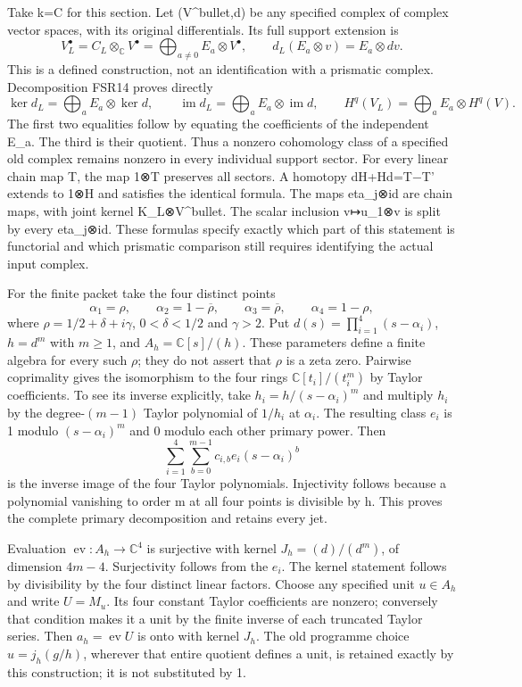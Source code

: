 \documentclass[
  10pt,
  a4paper,
]{article}
\begin{document}
Take k=C for this section. Let (V\^{}bullet,d) be any specified complex
of complex vector spaces, with its original differentials. Its full
support extension is \[
V_L^\bullet=C_L\otimes_{\mathbb C}V^\bullet
=\bigoplus_{a\neq0}E_a\otimes V^\bullet,
\qquad d_L(E_a\otimes v)=E_a\otimes dv.
\tag{FSR23}
\] This is a defined construction, not an identification with a
prismatic complex. Decomposition FSR14 proves directly \[
\ker d_L=\bigoplus_a E_a\otimes\ker d,
\qquad\operatorname{im}d_L=\bigoplus_a E_a\otimes\operatorname{im}d,
\qquad H^q(V_L)=\bigoplus_a E_a\otimes H^q(V).
\tag{FSR24}
\] The first two equalities follow by equating the coefficients of the
independent E\_a. The third is their quotient. Thus a nonzero cohomology
class of a specified old complex remains nonzero in every individual
support sector. For every linear chain map T, the map 1⊗T preserves all
sectors. A homotopy dH+Hd=T−T' extends to 1⊗H and satisfies the
identical formula. The maps eta\_j⊗id are chain maps, with joint kernel
K\_L⊗V\^{}bullet. The scalar inclusion v↦u\_1⊗v is split by every
eta\_j⊗id. These formulas specify exactly which part of this statement
is functorial and which prismatic comparison still requires identifying
the actual input complex.

For the finite packet take the four distinct points \[
\alpha_1=\rho,\qquad\alpha_2=1-\overline\rho,\qquad
\alpha_3=\overline\rho,\qquad\alpha_4=1-\rho,
\] where \(\rho=1/2+\delta+i\gamma\), \(0<\delta<1/2\) and \(\gamma>2\).
Put \(d(s)=\prod_{i=1}^4(s-\alpha_i)\), \(h=d^m\) with \(m\ge1\), and
\(A_h=\mathbb C[s]/(h)\). These parameters define a finite algebra for
every such \(\rho\); they do not assert that \(\rho\) is a zeta zero.
Pairwise coprimality gives the isomorphism to the four rings
\(\mathbb C[t_i]/(t_i^m)\) by Taylor coefficients. To see its inverse
explicitly, take \(h_i=h/(s-\alpha_i)^m\) and multiply \(h_i\) by the
degree-\((m-1)\) Taylor polynomial of \(1/h_i\) at \(\alpha_i\). The
resulting class \(e_i\) is 1 modulo \((s-\alpha_i)^m\) and 0 modulo each
other primary power. Then \[
\sum_{i=1}^4\sum_{b=0}^{m-1}c_{i,b}e_i(s-\alpha_i)^b
\tag{FSR25}
\] is the inverse image of the four Taylor polynomials. Injectivity
follows because a polynomial vanishing to order m at all four points is
divisible by h. This proves the complete primary decomposition and
retains every jet.

Evaluation \(\operatorname{ev}:A_h\to\mathbb C^4\) is surjective with
kernel \(J_h=(d)/(d^m)\), of dimension \(4m-4\). Surjectivity follows
from the \(e_i\). The kernel statement follows by divisibility by the
four distinct linear factors. Choose any specified unit \(u\in A_h\) and
write \(U=M_u\). Its four constant Taylor coefficients are nonzero;
conversely that condition makes it a unit by the finite inverse of each
truncated Taylor series. Then \(a_h=\operatorname{ev}U\) is onto with
kernel \(J_h\). The old programme choice \(u=j_h(g/h)\), wherever that
entire quotient defines a unit, is retained exactly by this
construction; it is not substituted by 1.
\end{document}
